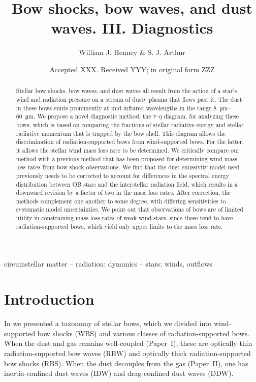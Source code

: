 \documentclass[useAMS, usenatbib, a4paper]{mnras}
\title
{Bow shocks, bow waves, and dust waves. III. Diagnostics}
\author[Henney \& Arthur]{
  William J. Henney \& S. J. Arthur\\
  \AddressCRyA
}
\date{Accepted XXX. Received YYY; in original form ZZZ}
\begin{document}
\label{firstpage}
\pagerange{\pageref{firstpage}--\pageref{lastpage}}
\maketitle
\begin{abstract}
  Stellar bow shocks, bow waves, and dust waves all result from the
  action of a star's wind and radiation pressure on a stream of dusty
  plasma that flows past it.  The dust in these bows emits prominently
  at mid-infrared wavelengths in the range \SIrange{8}{60}{\um}. We
  propose a novel diagnostic method, the \(\tau\)--\(\eta\) diagram, for
  analyzing these bows, which is based on comparing the fractions of
  stellar radiative energy and stellar radiative momentum that is
  trapped by the bow shell.  This diagram allows the discrimination of
  radiation-supported bows from wind-supported bows.  For the latter,
  it allows the stellar wind mass loss rate to be determined.  We
  critically compare our method with a previous method that has been
  proposed for determining wind mass loss rates from bow shock
  observations. We find that the dust emissivity model used previously
  needs to be corrected to account for differences in the spectral
  energy distribution between OB stars and the interstellar radiation
  field, which results in a downward revision by a factor of two in
  the mass loss rates.  After correction, the methods complement one
  another to some degree, with differing sensitivities to systematic
  model uncertainties.  We point out that observations of bows are of
  limited utility in constraining mass loss rates of weak-wind stars,
  since these tend to have radiation-supported bows, which yield only
  upper limits to the mass loss rate.
\end{abstract}

\begin{keywords}
  circumstellar matter -- radiation: dynamics -- stars: winds, outflows
\end{keywords}

\section{Introduction}
\label{sec:introduction}

In \citet[Paper~I and Paper~II]{Henney:2019a, Henney:2019b} we
presented a taxonomy of stellar bows, which we divided into
wind-supported bow shocks (WBS) and various classes of
radiation-supported bows.  When the dust and gas remains well-coupled
(Paper~I), these are optically thin radiation-supported bow waves
(RBW) and optically thick radiation-supported bow shocks (RBS).  When
the dust decouples from the gas (Paper~II), one has inertia-confined
dust waves (IDW) and drag-confined dust waves (DDW).
\end{document}
